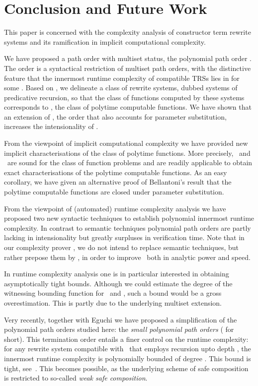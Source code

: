 \documentclass{LMCS}
\begin{document}
\section{Conclusion and Future Work}\label{s:conclusion}

This paper is concerned with the complexity analysis of
constructor term rewrite systems and its ramification in implicit
computational complexity.

We have proposed a path order with multiset status, 
the polynomial path order \POPSTAR. 
The order  is a syntactical restriction of multiset path orders, 
with the distinctive feature that the innermost runtime complexity
of compatible TRSs lies in  for some .
Based on , we delineate a class of rewrite systems, dubbed
systems of predicative recursion, 
so that the class of functions computed by these systems
corresponds to , the class of polytime computable functions.
We have shown that an extension of , the order 
that also accounts for parameter substitution, 
increases the intensionality of .

From the viewpoint of implicit computational complexity we
have provided new implicit characterisations of the
class of polytime functions. More precisely, \POPSTAR\ and \POPSTARP\ 
are sound for the class of function problems  and are readily
applicable to obtain exact characterisations of the polytime
computable functions. As an easy corollary, we have given
an alternative proof of Bellantoni's result that the polytime
computable functions are closed under parameter substitution. 

From the viewpoint of (automated) runtime complexity analysis
we have proposed two new syntactic techniques to establish
polynomial innermost runtime complexity. 
In contrast to semantic techniques polynomial path orders 
are partly lacking in intensionality but greatly surpluses
in verification time. Note that in our complexity prover \TCT, we do not intend to replace 
semantic techniques, but rather prepose them by \POPSTARP, in 
order to improve \TCT\ both in analytic power and speed. 

In runtime complexity analysis one is in particular interested 
in obtaining asymptotically tight bounds. 
Although we could estimate the degree of the witnessing
bounding function for \POPSTAR\ and \POPSTARP, 
such a bound would be a gross overestimation.
This is partly due to the underlying multiset extension.

Very recently, together with Eguchi we have proposed a
simplification of the polynomial path orders studied here: 
the \emph{small polynomial path orders} (\emph{\POPSTARS} for short).
This termination order entails a finer control on the runtime
complexity: for any rewrite system compatible with \POPSTARS\
that employs recursion upto depth , the innermost runtime complexity 
is polynomially bounded of degree . This bound is tight,
see~\cite{AEM12}.
This becomes possible, as the underlying scheme of safe composition
is restricted to so-called \emph{weak safe composition}.
\end{document}
